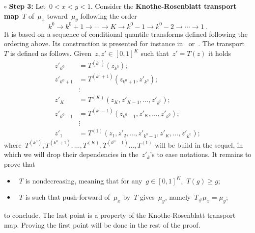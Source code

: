 \documentclass[final,numbib]{imaiai}%
\numberwithin{equation}{section}
\def\\bUnif{\text{\bUnif}}
\newcommand{\<}{\langle}
\renewcommand{\>}{\rangle}
\newcommand{\1}{\mathds{1}}
\begin{document}
{\medskip

\noindent
 {$\circ$ \bf Step 3: }
 Let~$0<x<y<1$. Consider the {\bf Knothe-Rosenblatt transport map}~$T$ of~$\mu_x$ toward~$\mu_y$ following the order
 \[
 k^0\to k^0+1\to\cdots\to K\to k^0-1\to k^0-2\to\cdots\to 1\,.
 \]
 It is based on a sequence of conditional quantile transforms defined following the ordering above. Its construction is presented for instance in~\cite[Sec.2.3, P.67]{santambrogio2015optimal} or~\cite[P.20]{villani2008optimal}. The transport~$T$ is defined as follows. Given~$z,z'\in[0,1]^K$ such that~$z'=T(z)$ it holds
 \begin{align*}
 z'_{k^0}&=T^{(k^0)}(z_{k^0});\\
 z'_{k^0+1}&=T^{(k^0+1)}(z_{k^0+1},z'_{k^0});\\
 &\vdots\\
 z'_K&=T^{(K)}(z_K,z'_{K-1},\ldots,z'_{k^0});\\
 z'_{k^0-1}&=T^{(k^0-1)}(z_{k^0-1},z'_K,\ldots,z'_{k^0});\\
 &\vdots\\
 z'_1&=T^{(1)}(z_1,z'_2,\ldots,z'_{k^0-1},z'_K,\ldots,z'_{k^0});
 \end{align*}
where~$T^{(k^0)}, T^{(k^0+1)},\ldots,T^{(K)},T^{(k^0-1)}\ldots,T^{(1)}$ will be build in the sequel, in which we will drop their dependencies in the~$z'_k$'s to ease notations. It remains to prove that 
 \begin{itemize}
 \item~$T$ is nondecreasing, meaning that for any~$g\in[0,1]^K$,~$T(g)\geq g$;
 \item~$T$ is such that push-forward of~$\mu_x$ by~$T$ gives~$\mu_y$, namely~$T_\#\mu_x=\mu_y$;
 \end{itemize}
 to conclude. The last point is a property of the Knothe-Rosenblatt transport map. Proving the first point will be done in the rest of  the proof.
 
 \medskip
 
}
\end{document}
